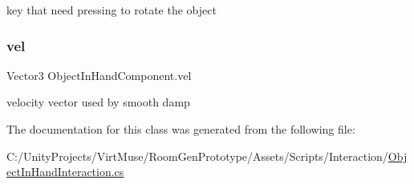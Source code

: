 key that need pressing to rotate the object 

\mbox{\label{class_object_in_hand_component_abbcf3780d099790d8d2e799ab4447ec6}} 
\subsubsection{\texorpdfstring{vel}{vel}}
{\footnotesize\ttfamily Vector3 Object\+In\+Hand\+Component.\+vel\hspace{0.3cm}{\ttfamily [private]}}



velocity vector used by smooth damp 



The documentation for this class was generated from the following file\+:\begin{DoxyCompactItemize}
\item 
C\+:/\+Unity\+Projects/\+Virt\+Muse/\+Room\+Gen\+Prototype/\+Assets/\+Scripts/\+Interaction/\mbox{\hyperlink{_object_in_hand_interaction_8cs}{Object\+In\+Hand\+Interaction.\+cs}}\end{DoxyCompactItemize}
